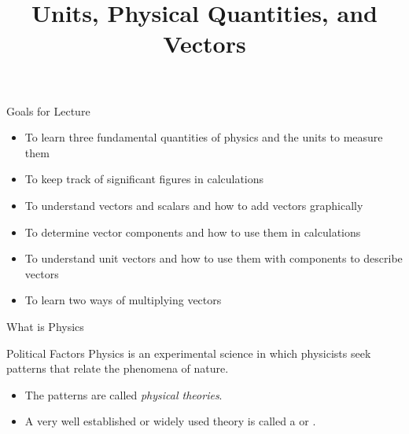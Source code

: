 \documentclass[18pt]{LectMechanics}
\title[Physics 1]{\huge\bfseries Units, Physical Quantities, and Vectors}
\date{}
\begin{document}
%
\begin{frame}
	\titlepage
\end{frame}
\usebackgroundtemplate{
}





\begin{frame}{Goals for Lecture}{}
	\begin{itemize}
		\item To learn three fundamental quantities of physics and the units to
		      measure them
		\item To keep track of significant figures in calculations
		\item To understand vectors and scalars and how to add vectors graphically
		\item To determine vector components and how to use them in calculations
		\item To understand unit vectors and how to use them with components to
		      describe vectors
		\item To learn two ways of multiplying vectors
	\end{itemize}
\end{frame}




\begin{frame}{What is Physics}{}
	\begin{boxedframe}{Political Factors}
		Physics is an experimental science in which physicists seek patterns that
		relate the phenomena of nature.
	\end{boxedframe}
	\begin{itemize}
		\item The patterns are called \emph{physical theories}.
		\item A very well established or widely used theory is called a
		       or .
	\end{itemize}
\end{frame}
\end{document}
